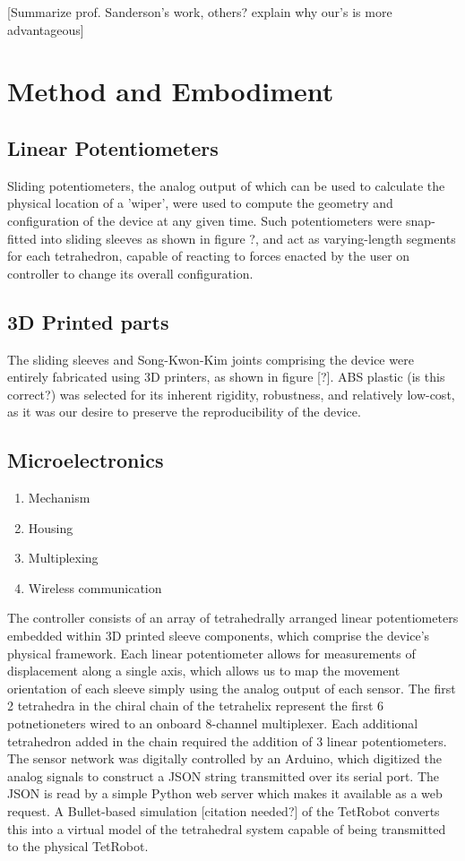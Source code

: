 \documentclass[11pt]{article}
\begin{document}
[Summarize prof. Sanderson's work, others? explain why our's is more advantageous]

\section{Method and Embodiment}
\subsection{Linear Potentiometers}

Sliding potentiometers, the analog output of which can be used to calculate the physical location of a 'wiper', were used to compute the geometry and configuration of the device at any given time. Such potentiometers were snap-fitted into sliding sleeves as shown in figure ?, and act as varying-length segments for each tetrahedron, capable of reacting to forces enacted by the user on controller to change its overall configuration.

\subsection{3D Printed parts}

The sliding sleeves and Song-Kwon-Kim joints comprising the device were entirely fabricated using 3D printers, as shown in figure [?]. ABS plastic (is this correct?) was selected for its inherent rigidity, robustness, and relatively low-cost, as it was our desire to preserve the reproducibility of the device. 

  \subsection{Microelectronics}
 \begin{enumerate}
 \item Mechanism
 \item Housing
 \item Multiplexing
 \item Wireless communication
 \end{enumerate}

 The controller consists of an array of tetrahedrally arranged linear potentiometers embedded within 3D printed sleeve components, which comprise the device's physical framework. Each linear potentiometer allows for measurements of displacement along a single axis, which allows us to map the movement orientation of each sleeve simply using the analog output of each sensor. The first 2 tetrahedra in the chiral chain of the tetrahelix represent the first 6 potnetioneters wired to an onboard 8-channel multiplexer. Each additional tetrahedron added in the chain required the addition of 3 linear potentiometers.
 The sensor network was digitally controlled by an Arduino, which digitized the analog signals to construct a JSON string transmitted over its serial port. The JSON is read by a simple Python web server which makes it available as a web request. A Bullet-based simulation [citation needed?] of the TetRobot converts this into a virtual model of the tetrahedral system capable of being transmitted to the physical TetRobot.
\end{document}
